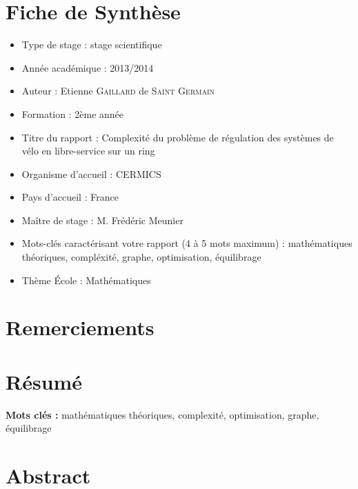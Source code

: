 \documentclass[twoside,11pt,openany,a4paper]{rapport}
\begin{document}
\cleardoublepage

\chapter*{Fiche de Synthèse}

\begin{itemize}
\item Type de stage : stage scientifique

\item Année académique : 2013/2014

\item Auteur : Etienne \textsc{Gaillard} de \textsc{Saint Germain}

\item Formation : 2ème année

\item Titre du rapport : Complexité du problème de régulation des systèmes de vélo en libre-service sur un ring

\item Organisme d’accueil : CERMICS

\item Pays d’accueil : France

\item Maître de stage : M. Frédéric Meunier

\item Mots-clés caractérisant votre rapport (4 à 5 mots maximum) : mathématiques théoriques, compléxité, graphe, optimisation, équilibrage

\item Thème École : Mathématiques
\end{itemize}


\chapter*{Remerciements}


\chapter*{Résumé}

\textbf{Mots clés :} mathématiques théoriques, complexité, optimisation, graphe, équilibrage

\chapter*{Abstract}
\end{document}
